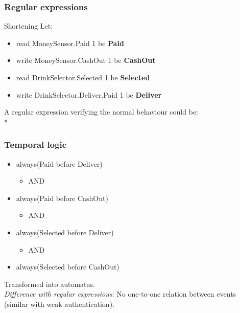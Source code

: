 \documentclass{beamer}
\begin{document}
\begin{frame}
    \frametitle{Regular expressions}

    \begin{block}{Shortening}
        Let:
        \begin{itemize}
            \item read MoneySensor.Paid 1 be {\bf Paid}
            \item write MoneySensor.CashOut 1 be {\bf CashOut}
            \item read DrinkSelector.Selected 1 be {\bf Selected}
            \item write DrinkSelector.Deliver.Paid 1 be {\bf Deliver}
        \end{itemize}
    \end{block}
    \vfill
    A regular expression verifying the normal behaviour could be:\\
    *
\end{frame}

\begin{frame}
    \frametitle{Temporal logic}

    \begin{itemize}
        \item[~] always(Paid before Deliver)
        \begin{itemize}
            \item[~] AND
        \end{itemize}
        \item[~] always(Paid before CashOut)
        \begin{itemize}
            \item[~] AND
        \end{itemize}
        \item[~] always(Selected before Deliver)
        \begin{itemize}
            \item[~] AND
        \end{itemize}
        \item[~] always(Selected before CashOut)
    \end{itemize}
    \vfill
    Transformed into automatas.\\
    {\em Difference  with regular expressions}: No one-to-one relation between events (similar with weak authentication).
\end{frame}
\end{document}
